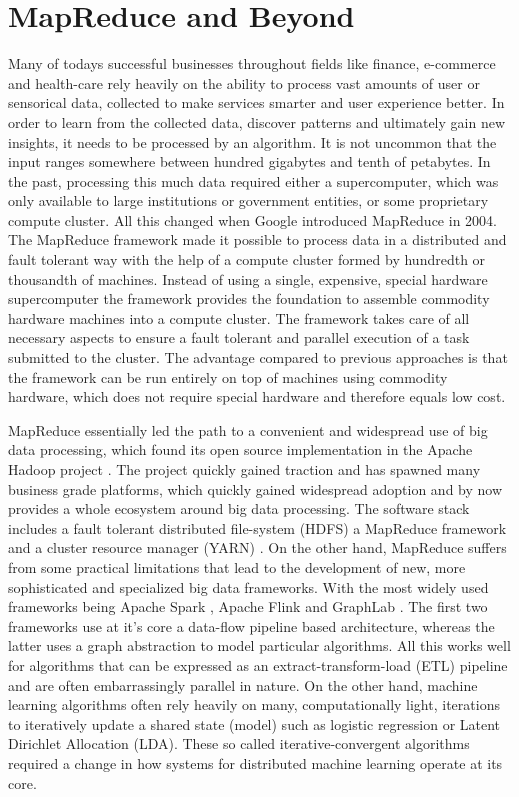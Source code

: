 \section{MapReduce and Beyond}
Many of todays successful businesses throughout fields like finance, e-commerce and health-care rely heavily on the ability to process vast amounts of user or sensorical data, collected to make services smarter and user experience better.
In order to learn from the collected data, discover patterns and ultimately gain new insights, it needs to be processed by an algorithm.
It is not uncommon that the input ranges somewhere between hundred gigabytes and tenth of petabytes.
In the past, processing this much data required either a supercomputer, which was only available to large institutions or government entities, or some proprietary compute cluster.
All this changed when Google introduced MapReduce \cite{Dean2004} in 2004.
The MapReduce framework made it possible to process data in a distributed and fault tolerant way with the help of a compute cluster formed by hundredth or thousandth of machines.
Instead of using a single, expensive, special hardware supercomputer the framework provides the foundation to assemble commodity hardware machines into a compute cluster.
The framework takes care of all necessary aspects to ensure a fault tolerant and parallel execution of a task submitted to the cluster.
The advantage compared to previous approaches is that the framework can be run entirely on top of machines using commodity hardware, which does not require special hardware and therefore equals low cost.

MapReduce essentially led the path to a convenient and widespread use of big data processing, which found its open source implementation in the Apache Hadoop project \cite{hadoop2009hadoop}.
The project quickly gained traction and has spawned many business grade platforms, which quickly gained widespread adoption and by now provides a whole ecosystem around big data processing. The software stack includes a fault tolerant distributed file-system (HDFS) a MapReduce framework and a cluster resource manager (YARN) \cite{KumarVavilapalli2013}.
On the other hand, MapReduce suffers from some practical limitations that lead to the development of new, more sophisticated and specialized big data frameworks. With the most widely used frameworks being Apache Spark \cite{Zaharia2010}, Apache Flink \cite{Alexandrov2014} and GraphLab \cite{Low2012}.
The first two frameworks use at it's core a data-flow pipeline based architecture, whereas the latter uses a graph abstraction to model particular algorithms.
All this works well for algorithms that can be expressed as an extract-transform-load (ETL) pipeline and are often embarrassingly parallel in nature.
On the other hand, machine learning algorithms often rely heavily on many, computationally light, iterations to iteratively update a shared state (model) such as logistic regression or Latent Dirichlet Allocation (LDA).
These so called iterative-convergent algorithms required a change in how systems for distributed machine learning operate at its core.


